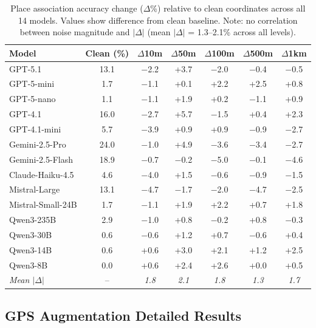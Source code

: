 \begin{table}[htbp]
\centering
\caption{Place association accuracy change ($\Delta$\%) relative to clean coordinates across all 14 models. Values show difference from clean baseline. Note: no correlation between noise magnitude and $|\Delta|$ (mean $|\Delta|$ = 1.3--2.1\% across all levels).}
\label{tab:place_assoc_noise_results}
\small
\begin{tabular}{lccccc|c}
\toprule
\textbf{Model} & \textbf{Clean (\%)} & \textbf{$\Delta$10m} & \textbf{$\Delta$50m} & \textbf{$\Delta$100m} & \textbf{$\Delta$500m} & \textbf{$\Delta$1km} \\
\midrule
GPT-5.1 & 13.1 & $-$2.2 & +3.7 & $-$2.0 & $-$0.4 & $-$0.5 \\
GPT-5-mini & 1.7 & $-$1.1 & +0.1 & +2.2 & +2.5 & +0.8 \\
GPT-5-nano & 1.1 & $-$1.1 & +1.9 & +0.2 & $-$1.1 & +0.9 \\
GPT-4.1 & 16.0 & $-$2.7 & +5.7 & $-$1.5 & +0.4 & +2.3 \\
GPT-4.1-mini & 5.7 & $-$3.9 & +0.9 & +0.9 & $-$0.9 & $-$2.7 \\
\midrule
Gemini-2.5-Pro & 24.0 & $-$1.0 & +4.9 & $-$3.6 & $-$3.4 & $-$2.7 \\
Gemini-2.5-Flash & 18.9 & $-$0.7 & $-$0.2 & $-$5.0 & $-$0.1 & $-$4.6 \\
\midrule
Claude-Haiku-4.5 & 4.6 & $-$4.0 & +1.5 & $-$0.6 & $-$0.9 & $-$1.5 \\
\midrule
Mistral-Large & 13.1 & $-$4.7 & $-$1.7 & $-$2.0 & $-$4.7 & $-$2.5 \\
Mistral-Small-24B & 1.7 & $-$1.1 & +1.9 & +2.2 & +0.7 & +1.8 \\
\midrule
Qwen3-235B & 2.9 & $-$1.0 & +0.8 & $-$0.2 & +0.8 & $-$0.3 \\
Qwen3-30B & 0.6 & $-$0.6 & +1.2 & +0.7 & $-$0.6 & +0.4 \\
Qwen3-14B & 0.6 & +0.6 & +3.0 & +2.1 & +1.2 & +2.5 \\
Qwen3-8B & 0.0 & +0.6 & +2.4 & +2.6 & +0.0 & +0.5 \\
\midrule
\textit{Mean $|\Delta|$} & -- & \textit{1.8} & \textit{2.1} & \textit{1.8} & \textit{1.3} & \textit{1.7} \\
\bottomrule
\end{tabular}
\end{table}

\subsection{GPS Augmentation Detailed Results}
\label{app:downstream}

